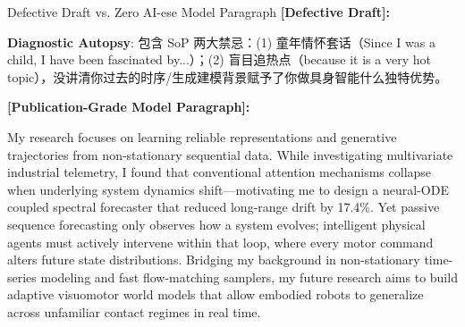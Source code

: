 \begin{ExampleBox}{Defective Draft vs. Zero AI-ese Model Paragraph}
\textbf{\color{TargetHighlight}[Defective Draft]:}\par
{}\par\vspace{4pt}
\textbf{Diagnostic Autopsy}: 包含 SoP 两大禁忌：(1)  童年情怀套话（Since I was a child, I have been fascinated by...）；(2)  盲目追热点（because it is a very hot topic），没讲清你过去的时序/生成建模背景赋予了你做具身智能什么独特优势。\par\vspace{6pt}
\textbf{\color{AcadNavy}[Publication-Grade Model Paragraph]:}\par
My research focuses on learning reliable representations and generative trajectories from non-stationary sequential data. While investigating multivariate industrial telemetry, I found that conventional attention mechanisms collapse when underlying system dynamics shift---motivating me to design a neural-ODE coupled spectral forecaster that reduced long-range drift by 17.4\%. Yet passive sequence forecasting only observes how a system evolves; intelligent physical agents must actively intervene within that loop, where every motor command alters future state distributions. Bridging my background in non-stationary time-series modeling and fast flow-matching samplers, my future research aims to build adaptive visuomotor world models that allow embodied robots to generalize across unfamiliar contact regimes in real time.
\end{ExampleBox}
